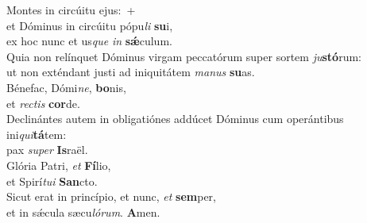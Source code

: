 \evenverse Montes in circúitu ejus:~+\\\evenverse  et Dóminus in circúitu pópu\textit{li} \textbf{su}i,~\*\\
\evenverse ex hoc nunc et us\textit{que} \textit{in} \textbf{sǽ}culum.\\
\oddverse Quia non relínquet Dóminus virgam peccatórum super sortem \textit{ju}\textbf{stó}rum:~\*\\
\oddverse ut non exténdant justi ad iniquitátem \textit{ma}\textit{nus} \textbf{su}as.\\
\evenverse Bénefac, Dómi\textit{ne}, \textbf{bo}nis,~\*\\
\evenverse et \textit{re}\textit{ctis} \textbf{cor}de.\\
\oddverse Declinántes autem in obligatiónes addúcet Dóminus cum operántibus ini\textit{qui}\textbf{tá}tem:~\*\\
\oddverse pax \textit{su}\textit{per} \textbf{Is}raël.\\
\evenverse Glória Patri, \textit{et} \textbf{Fí}lio,~\*\\
\evenverse et Spirí\textit{tu}\textit{i} \textbf{San}cto.\\
\oddverse Sicut erat in princípio, et nunc, \textit{et} \textbf{sem}per,~\*\\
\oddverse et in sǽcula sæcu\textit{ló}\textit{rum}. \textbf{A}men.\\
